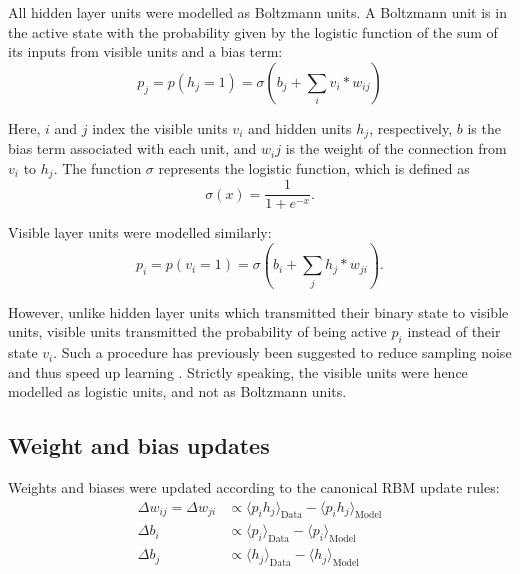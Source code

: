 \documentclass[11pt]{article}
\begin{document}
All hidden layer units were modelled as Boltzmann units. A Boltzmann
unit is in the active state with the probability given by the logistic
function of the sum of its inputs from visible units and a bias term:
\begin{equation}
  p_j = p(h_j = 1) = \sigma(b_j + \sum_i v_i * w_{ij})
\end{equation}

Here, $i$ and $j$ index the visible units $v_i$ and hidden units $h_j$,
respectively, $b$ is the bias term associated with each unit, and
$w_ij$ is the weight of the connection from $v_i$ to $h_j$. The function
$\sigma$ represents the logistic function, which is defined as
\begin{equation}
  \sigma(x) = \frac{1}{1 + e^{-x}}.
\end{equation}

Visible layer units were modelled similarly:
\begin{equation}
  p_i = p(v_i = 1) = \sigma(b_i + \sum_j h_j * w_{ji}).
\end{equation}

However, unlike hidden layer units which transmitted their binary
state to visible units, visible units transmitted the probability of
being active $p_i$ instead of their state $v_i$. Such a procedure has
previously been suggested to reduce sampling noise and thus speed up
learning \citep{Hinton2012}. Strictly speaking, the visible units were
hence modelled as logistic units, and not as Boltzmann units.

\subsection{Weight and bias updates}

Weights and biases were updated according to the canonical RBM update rules:
\begin{align}
  \label{eq:rbm_update_equations}
  \Delta w_{ij} = \Delta w_{ji} &\propto \langle p_{i}h_{j} \rangle_{\text{Data}} - \langle p_{i}h_{j} \rangle_{\text{Model}} \\
  \Delta b_{i}                  &\propto \langle p_{i}      \rangle_{\text{Data}} - \langle p_{i}      \rangle_{\text{Model}} \\
  \Delta b_{j}                  &\propto \langle h_{j}      \rangle_{\text{Data}} - \langle h_{j}      \rangle_{\text{Model}}
\end{align}
\end{document}
